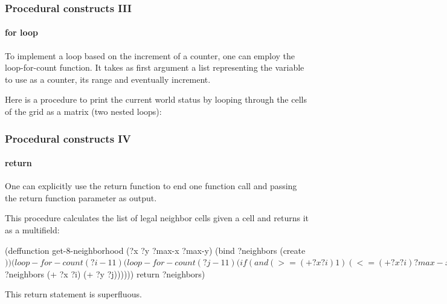 \documentclass[xcolor={usenames,dvipsnames,svgnames}, compress]{beamer}
\begin{document}
\begin{frame}[fragile]
  \frametitle{Procedural constructs III}
  \framesubtitle{for loop}
  To implement a loop based on the increment of a counter, one can
  employ the \textsf{loop-for-count} function. It takes as first
  argument a list representing the variable to use as a counter, its
  range and eventually increment.\par\bigskip

  Here is a procedure to print the current world status by looping
  through the cells of the grid as a matrix (two nested loops):
\end{frame}

\begin{frame}[fragile]
  \frametitle{Procedural constructs IV}
  \framesubtitle{return}
  One can explicitly use the \textsf{return} function to end one
  function call and passing the \textsf{return} function parameter as
  output.\par
  This procedure calculates the list of legal neighbor cells given a
  cell and returns it as a multifield:
  \begin{clips-code}[numbers=none]
    (deffunction get-8-neighborhood
        (?x ?y ?max-x ?max-y)
        (bind ?neighbors (create$))
        (loop-for-count (?i -1 1)
            (loop-for-count (?j -1 1)
                (if (and (>= (+ ?x ?i) 1)
                         (<= (+ ?x ?i) ?max-x)
                         (>= (+ ?y ?j) 1)
                         (<= (+ ?y ?j) ?max-y)
                         (or (<> ?i 0) (<> ?j 0)))
                    then (bind ?neighbors
                         (create$ ?neighbors (+ ?x ?i) (+ ?y ?j))))))
        return ?neighbors)
  \end{clips-code}
  This return statement is superfluous.    
\end{frame}
\end{document}
